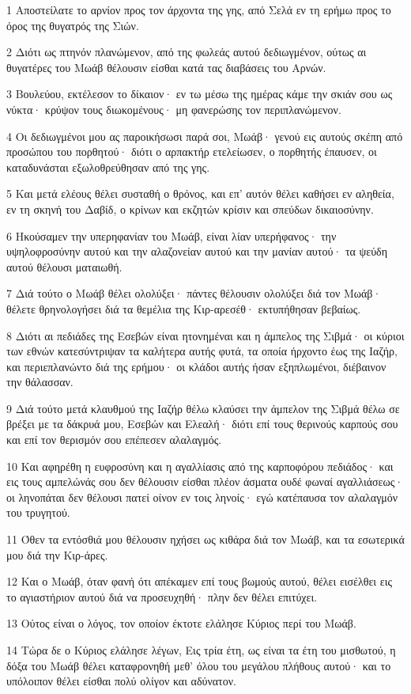 \par 1 Αποστείλατε το αρνίον προς τον άρχοντα της γης, από Σελά εν τη ερήμω προς το όρος της θυγατρός της Σιών.
\par 2 Διότι ως πτηνόν πλανώμενον, από της φωλεάς αυτού δεδιωγμένον, ούτως αι θυγατέρες του Μωάβ θέλουσιν είσθαι κατά τας διαβάσεις του Αρνών.
\par 3 Βουλεύου, εκτέλεσον το δίκαιον· εν τω μέσω της ημέρας κάμε την σκιάν σου ως νύκτα· κρύψον τους διωκομένους· μη φανερώσης τον περιπλανώμενον.
\par 4 Οι δεδιωγμένοι μου ας παροικήσωσι παρά σοι, Μωάβ· γενού εις αυτούς σκέπη από προσώπου του πορθητού· διότι ο αρπακτήρ ετελείωσεν, ο πορθητής έπαυσεν, οι καταδυνάσται εξωλοθρεύθησαν από της γης.
\par 5 Και μετά ελέους θέλει συσταθή ο θρόνος, και επ' αυτόν θέλει καθήσει εν αληθεία, εν τη σκηνή του Δαβίδ, ο κρίνων και εκζητών κρίσιν και σπεύδων δικαιοσύνην.
\par 6 Ηκούσαμεν την υπερηφανίαν του Μωάβ, είναι λίαν υπερήφανος· την υψηλοφροσύνην αυτού και την αλαζονείαν αυτού και την μανίαν αυτού· τα ψεύδη αυτού θέλουσι ματαιωθή.
\par 7 Διά τούτο ο Μωάβ θέλει ολολύξει· πάντες θέλουσιν ολολύξει διά τον Μωάβ· θέλετε θρηνολογήσει διά τα θεμέλια της Κιρ-αρεσέθ· εκτυπήθησαν βεβαίως.
\par 8 Διότι αι πεδιάδες της Εσεβών είναι ητονημέναι και η άμπελος της Σιβμά· οι κύριοι των εθνών κατεσύντριψαν τα καλήτερα αυτής φυτά, τα οποία ήρχοντο έως της Ιαζήρ, και περιεπλανώντο διά της ερήμου· οι κλάδοι αυτής ήσαν εξηπλωμένοι, διέβαινον την θάλασσαν.
\par 9 Διά τούτο μετά κλαυθμού της Ιαζήρ θέλω κλαύσει την άμπελον της Σιβμά θέλω σε βρέξει με τα δάκρυά μου, Εσεβών και Ελεαλή· διότι επί τους θερινούς καρπούς σου και επί τον θερισμόν σου επέπεσεν αλαλαγμός.
\par 10 Και αφηρέθη η ευφροσύνη και η αγαλλίασις από της καρποφόρου πεδιάδος· και εις τους αμπελώνάς σου δεν θέλουσιν είσθαι πλέον άσματα ουδέ φωναί αγαλλιάσεως· οι ληνοπάται δεν θέλουσι πατεί οίνον εν τοις ληνοίς· εγώ κατέπαυσα τον αλαλαγμόν του τρυγητού.
\par 11 Όθεν τα εντόσθιά μου θέλουσιν ηχήσει ως κιθάρα διά τον Μωάβ, και τα εσωτερικά μου διά την Κιρ-άρες.
\par 12 Και ο Μωάβ, όταν φανή ότι απέκαμεν επί τους βωμούς αυτού, θέλει εισέλθει εις το αγιαστήριον αυτού διά να προσευχηθή· πλην δεν θέλει επιτύχει.
\par 13 Ούτος είναι ο λόγος, τον οποίον έκτοτε ελάλησε Κύριος περί του Μωάβ.
\par 14 Τώρα δε ο Κύριος ελάλησε λέγων, Εις τρία έτη, ως είναι τα έτη του μισθωτού, η δόξα του Μωάβ θέλει καταφρονηθή μεθ' όλου του μεγάλου πλήθους αυτού· και το υπόλοιπον θέλει είσθαι πολύ ολίγον και αδύνατον.

